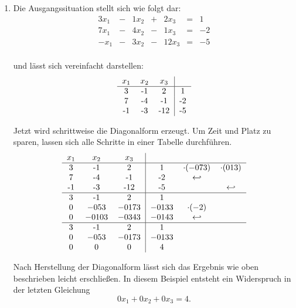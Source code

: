 		\begin{enumerate}
				\item
				
					Die Ausgangssituation stellt sich wie folgt dar:
					\[
						\begin{array} {ccccccc}
							3 x_1 & - & 1 x_2 & + & 2 x_3 & = & 1\\
							7 x_1 & - & 4 x_2 & - & 1 x_3 & = & -2\\
							- x_1 & - & 3 x_2 & - & 12 x_3 & = & -5\\
						\end{array}
					\]
					
					und l\"asst sich vereinfacht darstellen:
					\[
						\begin{tabular} {ccc|c}
							$x_1$ & $x_2$ & $x_3$ &\\
							\hline
							3 & -1 & 2 & 1\\
							7 & -4 & -1 & -2\\
							-1 & -3 & -12 & -5\\
						\end{tabular}
					\]
					
					Jetzt wird schrittweise die Diagonalform erzeugt.
					Um Zeit und Platz zu sparen, lassen sich alle Schritte in einer Tabelle durchf\"uhren.
					\[
						\begin{tabular} {ccc|ccc}
							$x_1$ & $x_2$ & $x_3$ & & &\\
							\hline
							3 & -1 & 2 & 1 & $\cdot (-\frac{7} {3})$ & $\cdot (\frac{1} {3})$\\
							7 & -4 & -1 & -2 & $\hookleftarrow$ &\\
							-1 & -3 & -12 & -5 & & $\hookleftarrow$\\
							\hline
							3 & -1 & 2 & 1 & &\\
							0 & $-\frac{5} {3}$ & $-\frac{17} {3}$ & $-\frac{13} {3}$ & $\cdot (-2)$ &\\
							0 & $-\frac{10} {3}$ & $-\frac{34} {3}$ & $-\frac{14} {3}$ & $\hookleftarrow$ &\\
							\hline
							3 & -1 & 2 & 1 & &\\
							0 & $-\frac{5} {3}$ & $-\frac{17} {3}$ & $-\frac{13} {3}$ & &\\
							0 & 0 & 0 & 4 & &\\
						\end{tabular}
					\]
					
					Nach Herstellung der Diagonalform l\"asst sich das Ergebnis wie oben beschrieben leicht erschlie\ss en.
					In diesem Beispiel entsteht ein Widerspruch in der letzten Gleichung
					\[
						0 x_1 + 0 x_2 + 0 x_3 = 4.
					\]
					

\end{enumerate}
